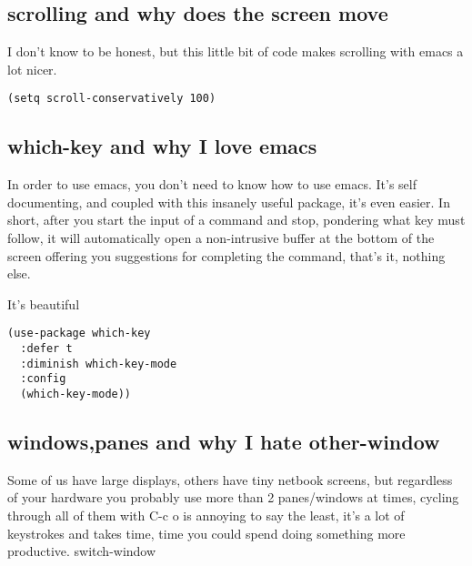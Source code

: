 \documentclass[12pt]{article}
\begin{document}
\subsection{scrolling and why does the screen move}
\label{sec:orgdf335e8}

I don’t know to be honest, but this little bit of code makes scrolling with emacs a lot nicer.
\begin{verbatim}
(setq scroll-conservatively 100)
\end{verbatim}

\subsection{which-key and why I love emacs}
\label{sec:org2e7d193}

In order to use emacs, you don’t need to know how to use emacs. It’s self documenting, and coupled with this insanely useful package, it’s even easier. In short, after you start the input of a command and stop, pondering what key must follow, it will automatically open a non-intrusive buffer at the bottom of the screen offering you suggestions for completing the command, that’s it, nothing else.

It’s beautiful
\begin{verbatim}
(use-package which-key
  :defer t
  :diminish which-key-mode
  :config
  (which-key-mode))
\end{verbatim}

\subsection{windows,panes and why I hate other-window}
\label{sec:org62dee42}

Some of us have large displays, others have tiny netbook screens, but regardless of your hardware you probably use more than 2 panes/windows at times, cycling through all of them with C-c o is annoying to say the least, it’s a lot of keystrokes and takes time, time you could spend doing something more productive.
switch-window
\end{document}
